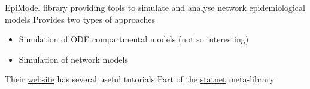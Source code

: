 \documentclass[aspectratio=43]{beamer}
\begin{document}
% 
% 
% 
% 
% 


\begin{frame}{EpiModel}
 library providing tools to simulate and analyse network epidemiological models
\vfill
Provides two types of approaches
\begin{itemize}
\item Simulation of ODE compartmental models (not so interesting)
\item Simulation of network models
\end{itemize}
\vfill
Their \href{https://www.epimodel.org}{website} has several useful tutorials
\vfill
Part of the \href{http://statnet.org/}{statnet} meta-library
\end{frame}
\end{document}
